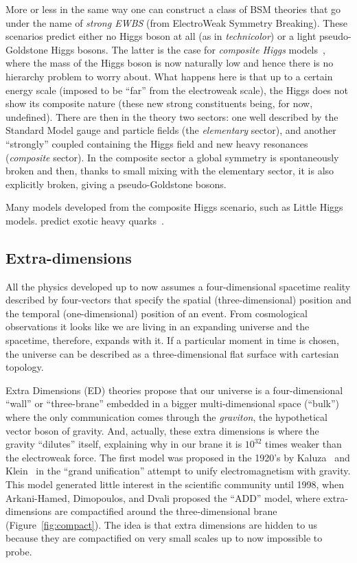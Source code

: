 More or less in the same way one can construct 
a class of BSM theories that go under the name
of {\it strong EWBS} (from ElectroWeak Symmetry Breaking).
These scenarios predict either no Higgs boson at all 
(as in {\it technicolor})
or a light pseudo-Goldstone Higgs bosons. The latter
is the case for {\it composite Higgs} models~\cite{Vecchi:2013bja,delAguila:2010vg}, 
where the mass of the Higgs boson is now naturally low and
hence there is no hierarchy problem to worry about.
What happens here is that up to a certain energy scale
(imposed to be ``far'' from the electroweak scale), the
Higgs does not show its composite nature (these new strong
constituents being, for now, undefined). There are then
in the theory two sectors: one well described by 
the Standard Model gauge and particle fields (the 
{\it elementary} sector), and another ``strongly'' coupled
containing the Higgs field and new heavy resonances 
({\it composite} sector).
In the composite sector a global symmetry is spontaneously 
broken and then, thanks to small mixing with the
elementary sector, it is also explicitly broken, giving
a pseudo-Goldstone bosons. 

Many models developed from the composite Higgs scenario,
such as Little Higgs models. predict
exotic heavy quarks~\cite{Contino:2008hi,Mrazek:2009yu}.


\subsection{Extra-dimensions}\label{sec:extradimensions}

All the physics developed up to now assumes a 
four-dimensional spacetime reality described 
by four-vectors that specify the spatial (three-dimensional) 
position and the temporal (one-dimensional) position of
an event.
From cosmological observations it looks like
we are living in an expanding universe and the
spacetime, therefore, expands with it.
If a particular moment in time is chosen, the
universe can be described as a three-dimensional 
flat surface with cartesian topology.

Extra Dimensions (ED) theories propose that
our universe is a four-dimensional ``wall'' or 
``three-brane'' embedded in a bigger multi-dimensional space 
(``bulk'') where the only communication comes through
the {\it graviton}, the hypothetical vector boson of gravity.
And, actually, these extra dimensions is where the gravity
``dilutes'' itself, explaining why in our brane it is
$10^{32}$ times weaker than the electroweak force.
The first model was proposed in the 1920's by
Kaluza~\cite{Kaluza} and Klein~\cite{Klein} 
in the ``grand unification''
attempt to unify electromagnetism with gravity.
This model generated little interest in the scientific community 
until 1998, when Arkani-Hamed, Dimopoulos, and Dvali
\cite{ArkaniHamed:1998rs} proposed the ``ADD'' model, 
where extra-dimensions are compactified around the 
three-dimensional brane (Figure~\ref{fig:compact}).
The idea is that extra dimensions are hidden to us because
they are compactified on very small scales up to now impossible
to probe.


